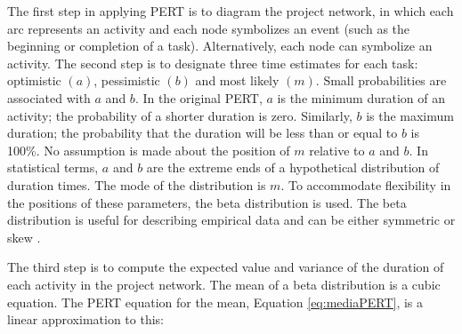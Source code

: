 The first step in applying PERT is to diagram the project network, in which each arc represents an activity and each node symbolizes an event (such as the beginning or completion of a task). Alternatively, each node can symbolize an activity. The second step is to designate three time estimates for each task: optimistic $(a)$, pessimistic $(b)$ and most likely $(m)$. Small probabilities are associated with $a$ and $b$. In the original PERT, $a$ is the minimum duration of an activity; the probability of a shorter duration is zero. Similarly, $b$ is the maximum duration; the probability that the duration will be less than or equal to $b$ is 100\%. No assumption is made about the position of $m$ relative to $a$ and $b$. In statistical terms, $a$ and $b$ are the extreme ends of a hypothetical distribution of duration times. The mode of the distribution is $m$. To accommodate flexibility in the positions of these parameters, the beta distribution is used. The beta distribution is useful for describing empirical data and can be either symmetric or skew \cite{cottrell1999simplified}.

The third step is to compute the expected value and variance of the duration of each activity in the project network. The mean of a beta distribution is a cubic equation. The PERT equation for the mean, Equation \ref{eq:mediaPERT}, is a linear approximation to this:


